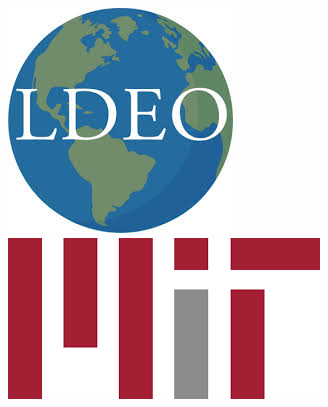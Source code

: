 \begin{titlepage}
\hspace{+0.4cm}\includegraphics[scale=0.16]{fig/ldeo.jpg}
\hspace{+0.4cm}\includegraphics[scale=0.15]{fig/mit.png}\\
\hdashrule{\linewidth}{0.5pt}{}
\end{titlepage}


